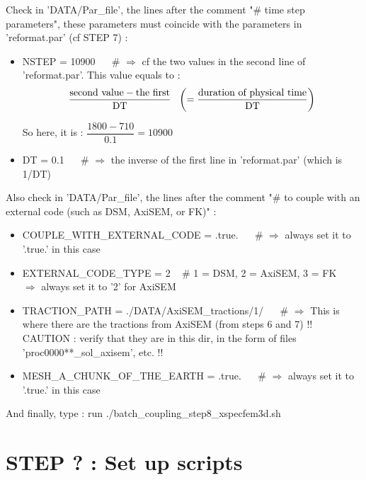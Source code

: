\documentclass[11pt]{article}
\newcommand{\ds}{\displaystyle}
\begin{document}
\medskip

\noindent Check in 'DATA/Par\_file', the lines after the comment "\# time step parameters", these parameters must coincide with the parameters in  'reformat.par' (cf STEP 7) :

\begin{itemize}

\item[\textbullet] NSTEP = 10900 ~~ \# $\Longrightarrow$ cf the two values in the second line of 'reformat.par'. This value equals to :
$$\ds \dfrac{\hbox{second value} - \hbox{the first}}{\text{DT}} ~~ \left(= \dfrac{\hbox{duration of physical time}}{\text{DT}} \right)$$

\noindent So here, it is : $\ds \dfrac{1800 - 710}{0.1} = 10900$

\medskip

\item[\textbullet] DT = 0.1 ~~ \# $\Longrightarrow$ the inverse of the first line in 'reformat.par' (which is 1/DT)

\end{itemize}

\medskip

\noindent Also check in 'DATA/Par\_file', the lines after the comment "\# to couple with an external code (such as DSM, AxiSEM, or FK)" :

\begin{itemize}

\item[\textbullet] COUPLE\_WITH\_EXTERNAL\_CODE = .true. ~~ \# $\Longrightarrow$ always set it to '.true.' in this case

\item[\textbullet] EXTERNAL\_CODE\_TYPE = 2  ~ \# 1 = DSM, 2 = AxiSEM, 3 = FK ~~ $\Longrightarrow$ always set it to '2' for AxiSEM

\item[\textbullet] TRACTION\_PATH  = ./DATA/AxiSEM\_tractions/1/ ~~   \# $\Longrightarrow$ This is where there are the tractions from AxiSEM (from steps 6 and 7) !! CAUTION : verify that they are in this dir, in the form of files 'proc0000**\_sol\_axisem', etc. !!

\item[\textbullet] MESH\_A\_CHUNK\_OF\_THE\_EARTH  = .true.  ~~  \# $\Longrightarrow$ always set it to '.true.' in this case

\end{itemize}

\medskip

\noindent And finally, type : run ./batch\_coupling\_step8\_xspecfem3d.sh

\section{STEP ? : Set up scripts}
\end{document}
